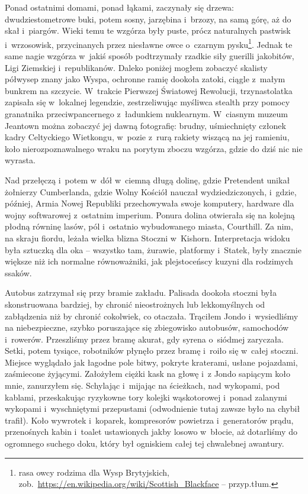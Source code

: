 \documentclass[oneside,polish,11pt,sfheadings]{mwbk}
\begin{document}
Ponad ostatnimi domami, ponad łąkami, zaczynały się drzewa:
dwudziestometrowe buki, potem sosny, jarzębina i~brzozy, na samą górę,
aż do skał i~piargów. Wieki temu te wzgórza były puste, prócz
naturalnych pastwisk i~wrzosowisk, przycinanych przez niesławne owce o~czarnym pysku\footnote{ rasa owcy rodzima dla Wysp Brytyjskich,
zob.~\url{https://en.wikipedia.org/wiki/Scottish\_Blackface} -- przyp.tłum.}. Jednak te same nagie wzgórza w~jakiś sposób podtrzymały
rzadkie siły guerilli jakobitów, Ligi Ziemskiej i~republikanów. Daleko
poniżej mogłem zobaczyć skalisty półwysep znany jako Wyspa, ochronne
ramię dookoła zatoki, ciągle z~małym bunkrem na szczycie. W~trakcie
Pierwszej Światowej Rewolucji, trzynastolatka zapisała się w~lokalnej
legendzie, zestrzeliwując myśliwca stealth przy pomocy granatnika
przeciwpancernego z~ładunkiem nuklearnym. W~ciasnym muzeum Jeantown
można zobaczyć jej dawną fotografię: brudny, uśmiechnięty członek kadry
Celtyckiego Wietkongu, w~pozie z~rurą rakiety wiszącą na jej ramieniu,
koło nierozpoznawalnego wraku na porytym zboczu wzgórza, gdzie do dziś
nic nie wyrasta.

Nad przełęczą i~potem w~dół w~ciemną długą dolinę, gdzie Pretendent
unikał żołnierzy Cumberlanda, gdzie Wolny Kościół nauczał
wydziedziczonych, i~gdzie, później, Armia Nowej Republiki przechowywała
swoje komputery, hardware dla wojny softwarowej z~ostatnim imperium.
Ponura dolina otwierała się na kolejną płodną równinę lasów, pól i~ostatnio wybudowanego miasta, Courthill. Za nim, na skraju fiordu,
leżała wielka blizna Stoczni w~Kishorn. Interpretacja widoku była
sztuczką dla oka -- wszystko tam, żurawie, platformy i~Statek, były
znacznie większe niż ich normalne równoważniki, jak plejstoceńscy kuzyni
dla rodzimych ssaków.

Autobus zatrzymał się przy bramie zakładu. Palisada dookoła stoczni była
skonstruowana bardziej, by chronić nieostrożnych lub lekkomyślnych od
zabłądzenia niż by chronić cokolwiek, co otaczała. Trąciłem Jondo i~wysiedliśmy na niebezpieczne, szybko poruszające się zbiegowisko
autobusów, samochodów i~rowerów. Przeszliśmy przez bramę akurat, gdy
syrena o~siódmej zaryczała. Setki, potem tysiące, robotników płynęło
przez bramę i~roiło się w~całej stoczni. Miejsce wyglądało jak łagodne
pole bitwy, pokryte kraterami, usłane pojazdami, zaśmiecone żyjącymi.
Założyłem ciężki kask na głowę i~z Jondo sapiącym koło mnie, zanurzyłem
się. Schylając i~mijając na ścieżkach, nad wykopami, pod kablami,
przeskakując ryzykowne tory kolejki wąskotorowej i~ponad zalanymi
wykopami i~wyschniętymi przepustami (odwodnienie tutaj zawsze było na
chybił trafił). Koło wywrotek i~koparek, kompresorów powietrza i~generatorów prądu, przenośnych kabin i~toalet ustawionych jakby losowo w~błocie, aż dotarliśmy do ogromnego suchego doku, który był ogniskiem
całej tej chwalebnej awantury.
\end{document}
